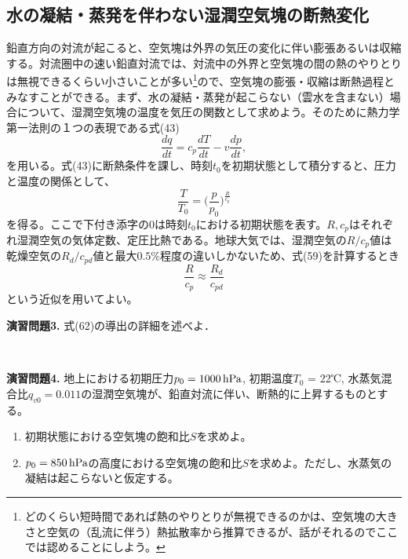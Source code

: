 \documentclass{jsarticle}
\begin{document}
\subsection{水の凝結・蒸発を伴わない湿潤空気塊の断熱変化}
鉛直方向の対流が起こると、空気塊は外界の気圧の変化に伴い膨張あるいは収縮する。対流圏中の速い鉛直対流では、対流中の外界と空気塊の間の熱のやりとりは無視できるくらい小さいことが多い\footnote{どのくらい短時間であれば熱のやりとりが無視できるのかは、空気塊の大きさと空気の（乱流に伴う）熱拡散率から推算できるが、話がそれるのでここでは認めることにしよう。}ので、空気塊の膨張・収縮は断熱過程とみなすことができる。まず、水の凝結・蒸発が起こらない（雲水を含まない）場合について、湿潤空気塊の温度を気圧の関数として求めよう。そのために熱力学第一法則の１つの表現である式(43) 
\begin{displaymath}
 \frac{dq}{dt}=c_{p}\frac{dT}{dt}-v\frac{dp}{dt} ,
\end{displaymath}
を用いる。式(43)に断熱条件を課し、時刻$t_{0}$を初期状態として積分すると、圧力と温度の関係として、
\begin{equation}
 \frac{T}{T_{0}}={\bigg (}\frac{p}{p_{0}}{\bigg )}^{\frac{R}{c_{p}}}
\end{equation}
を得る。ここで下付き添字の$0$は時刻$t_{0}$における初期状態を表す。$R, c_{p}$はそれぞれ湿潤空気の気体定数、定圧比熱である。地球大気では、湿潤空気の$R/c_{p}$値は乾燥空気の$R_{d}/c_{pd}$値と最大$0.5\%$程度の違いしかないため、式(59)を計算するとき
\begin{equation}
 \frac{R}{c_{p}} \approx \frac{R_{d}}{c_{pd}}
\end{equation}
という近似を用いてよい。
\\

\begin{itembox}[l]{\bf{演習問題3.}}
式(62)の導出の詳細を述べよ．
\end{itembox}
\\
\begin{itembox}[l]{\bf{演習問題4.}}
地上における初期圧力$p_{0}= 1000\,\rm{hPa}$, 初期温度$T_{0}$ = 22℃, 水蒸気混合比$q_{v0} = 0.011$の湿潤空気塊が、鉛直対流に伴い、断熱的に上昇するものとする。
\begin{enumerate}
\item 初期状態における空気塊の飽和比$S$を求めよ。
\item $p_{0}= 850\,\rm{hPa}$の高度における空気塊の飽和比$S$を求めよ。ただし、水蒸気の凝結は起こらないと仮定する。
\end{enumerate}
\end{itembox}
\end{document}
